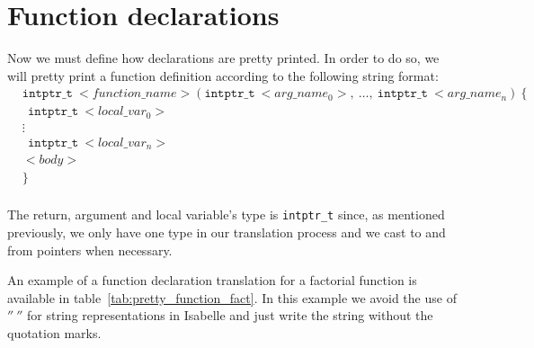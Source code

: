 \section{Function declarations}

Now we must define how declarations are pretty printed.
In order to do so, we will pretty print a function definition according to the following string format:
\begin{equation*}
\begin{split}
&\mathtt{intptr\_t} \ <function\_name>(\mathtt{intptr\_t}\ <arg\_name_0>,\ \dots,\ \mathtt{intptr\_t}\ <arg\_name_n)\ \{ \\
&\ \ \mathtt{intptr\_t}\ <local\_var_0> \\
&\vdots \\
&\ \ \mathtt{intptr\_t}\ <local\_var_n> \\
&<body> \\
&\} \\
\end{split}
\end{equation*}

The return, argument and local variable's type is \verb|intptr_t| since, as mentioned previously, we only have one type in our translation process and we cast to and from pointers when necessary.

An example of a function declaration translation for a factorial function is available in table~\ref{tab:pretty_function_fact}.
In this example we avoid the use of $''\ ''$ for string representations in Isabelle and just write the string without the quotation marks.

